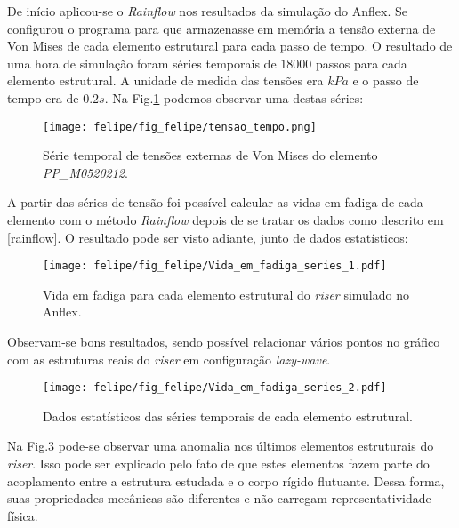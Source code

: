 De início aplicou-se o \emph{Rainflow} nos resultados da simulação do Anflex. Se configurou o programa para que armazenasse em memória a tensão externa de Von Mises de cada elemento estrutural para cada passo de tempo. O resultado de uma hora de simulação foram séries temporais de $18000$ passos para cada elemento estrutural. A unidade de medida das tensões era $kPa$ e o passo de tempo era de $0.2 s$. Na Fig.\ref{serie_temporal} podemos observar uma destas séries:

\begin{figure}[!ht]
    \centering
    \texttt{[image: felipe/fig\_felipe/tensao\_tempo.png]}
    \caption{Série temporal de tensões externas de Von Mises do elemento \emph{PP\_M0520212}. }
    \label{serie_temporal}
\end{figure}

A partir das séries de tensão foi possível calcular as vidas em fadiga de cada elemento com o método \emph{Rainflow} depois de se tratar os dados como descrito em \ref{rainflow}. O resultado pode ser visto adiante, junto de dados estatísticos:

\begin{figure}[!ht]
    \centering
    \texttt{[image: felipe/fig\_felipe/Vida\_em\_fadiga\_series\_1.pdf]} 
    \caption{Vida em fadiga para cada elemento estrutural do \emph{riser} simulado no Anflex. }
    \label{vida_em_fadiga}
\end{figure}

Observam-se bons resultados, sendo possível relacionar vários pontos no gráfico com as estruturas reais do \emph{riser} em configuração \emph{lazy-wave}.

\begin{figure}[!ht]
    \centering
    \texttt{[image: felipe/fig\_felipe/Vida\_em\_fadiga\_series\_2.pdf]} 
    \caption{Dados estatísticos das séries temporais de cada elemento estrutural. }
    \label{vida_em_fadiga_estatistica}
\end{figure}

Na Fig.\ref{vida_em_fadiga_estatistica} pode-se observar uma anomalia nos últimos elementos estruturais do \emph{riser}. Isso pode ser explicado pelo fato de que estes elementos fazem parte do acoplamento entre a estrutura estudada e o corpo rígido flutuante. Dessa forma, suas propriedades mecânicas são diferentes e não carregam representatividade física.

